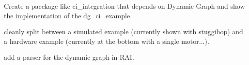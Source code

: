 
\begin{DoxyRefList}
\item[\label{todo__todo000001}%
\hypertarget{todo__todo000001}{}%
Page \hyperlink{subpage_basic_control_graph}{5/ Basic Control Graph} ]Create a pacckage like ci\+\_\+integration that depends on Dynamic Graph and show the implementation of the dg\+\_\+ci\+\_\+example.

cleanly split between a simulated example (currently shown with stuggihop) and a hardware example (currently at the bottom with a single motor...). 
\item[\label{todo__todo000003}%
\hypertarget{todo__todo000003}{}%
Page \hyperlink{subpage_plot}{5/ Oscilloscope / Plotting / Logging / Motor and control process timing} ]add a parser for the dynamic graph in R\+AI.
\end{DoxyRefList}